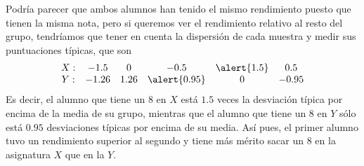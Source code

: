 \begin{frame}
{Podría parecer que ambos alumnos han tenido el mismo rendimiento puesto que tienen la misma nota, pero si queremos ver el rendimiento
relativo al resto del grupo, tendríamos que tener en cuenta la dispersión de cada muestra y medir sus puntuaciones típicas, que son 
\[
\begin{array}{cccccc}
X: & -1.5 & 0 & -0.5 & \alert{1.5} & 0.5 \\
Y: & -1.26 & 1.26 & \alert{0.95} & 0 & -0.95\\
\end{array}
\]
Es decir, el alumno que tiene un 8 en $X$ está $1.5$ veces la desviación típica por encima de la media de su grupo, mientras que el alumno
que tiene un 8 en $Y$ sólo está $0.95$ desviaciones típicas por encima de su media. Así pues, el primer alumno tuvo un rendimiento superior
al segundo y tiene más mérito sacar un $8$ en la asignatura $X$ que en la $Y$.
}
\end{frame}


